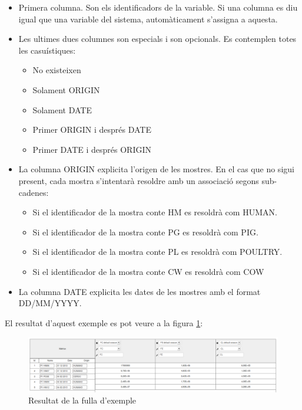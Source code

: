 \begin{itemize}
\item Primera columna. Son els identificadors de la variable. Si una columna es diu igual que una variable del sistema, automàticament s'assigna a aquesta.
\item Les ultimes dues columnes son especials i son opcionals. Es contemplen totes les casuístiques:
\begin{itemize}
\item No existeixen
\item Solament ORIGIN
\item Solament DATE
\item Primer ORIGIN i després DATE
\item Primer DATE i després ORIGIN
\end{itemize}
\item La columna ORIGIN explicita l'origen de les mostres. En el cas que no sigui present, cada mostra s'intentar\`{a} resoldre  amb un associació segons sub-cadenes:
\begin{itemize}
\item Si el identificador de la mostra conte HM es resoldrà com HUMAN.
\item Si el identificador de la mostra conte PG es resoldrà com PIG.
\item Si el identificador de la mostra conte PL es resoldrà com POULTRY.
\item Si el identificador de la mostra conte CW es resoldrà com COW
\end{itemize}
\item La columna DATE explicita les dates de les mostres amb el format DD/MM/YYYY.
\end{itemize}

El resultat d'aquest exemple es pot veure a la figura \ref{fig:matrixResulting}:
\begin{figure}[h!]
  \centering
  \includegraphics[scale=0.3]{img/userguide/matrix_resulting.png}
  \caption{Resultat de la fulla d'exemple}
  \label{fig:matrixResulting}
\end{figure}

